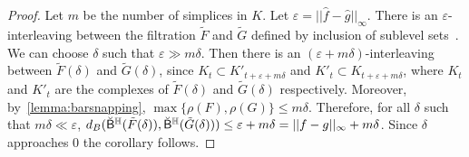 \documentclass[10pt,a4paper]{amsart}
\newcommand {\mm}[1] {\ifmmode{#1}\else{\mbox{\(#1\)}}\fi}
\newcommand{\har}           {\mm{\mathbb{H}}}
\newcommand{\eps}        {\varepsilon}
\theoremstyle{definition}
\newcommand{\Bei}[1]{{\color{cyan}[#1]}}
\newcommand{\obarc}{\breve{\mathsf{B}}^\har}
\theoremstyle{remark}
\begin{document}
\begin{proof}

    
    Let $m$ be the number of simplices in $K$. Let $\eps = ||\hat{f}-\hat{g}||_\infty$. There is an $\eps$-interleaving between the filtration $\tilde{F}$ and $\tilde{G}$ defined by inclusion of sublevel sets~\cite{Cohen-SteinerEdelsbrunnerHarer2005,ChazalCohenSteinerGlisse2009}. We can choose $\delta$ such that $\eps \gg m\delta$.
    Then there is an $(\eps+m\delta)$-interleaving between $\tilde{F}(\delta)$ and $\tilde{G}(\delta)$, since $K_{t} \subset K'_{t+\eps+m\delta}$ and $K'_{t} \subset K_{t+\eps+m\delta}$, where $K_t$ and $K'_t$ are the complexes of $\tilde{F}(\delta)$ and $\tilde{G}(\delta)$ respectively. Moreover, by~\cref{lemma:barsnapping}, $\max\{\rho(F), \rho(G)\} \leq m\delta$. Therefore, for all $\delta$ such that $m\delta \ll \eps$, $d_B ( {\obarc(\tilde{F}(\delta))}, {\obarc(\tilde{G}(\delta))} )  \leq \eps+m\delta = ||f-g||_\infty+m\delta$. Since $\delta$ approaches 0 the corollary follows. 
\end{proof}







\end{document}
